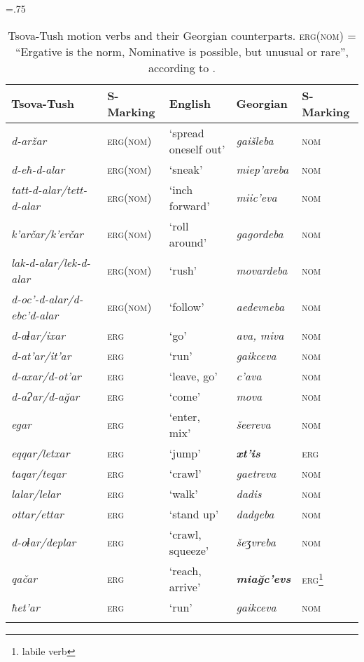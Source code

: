 \begin{table}
	\small
	\tabcolsep=.75\tabcolsep
	\begin{tabular}{lllll}
    \lsptoprule
		Tsova-Tush & {S-Marking} & {English} & {Georgian} & {S-Marking} \\
		\midrule
		\textit{d-aržar} & \textsc{erg(nom)} &  `spread oneself out'  &  \textit{gaišleba} & \textsc{nom} \\
		\textit{d-eħ-d-alar}& \textsc{erg(nom)} & `sneak' &  \textit{miep'areba} & \textsc{nom} \\
		\textit{tatt-d-alar/tett-d-alar} & \textsc{erg(nom)} & `inch forward'  & \textit{miic'eva} & \textsc{nom} \\
		\textit{k'arčar/k'erčar} & \textsc{erg(nom)} & `roll around' &  \textit{gagordeba} & \textsc{nom} \\
		\textit{lak-d-alar/lek-d-alar} & \textsc{erg(nom)} & `rush' &  \textit{movardeba} & \textsc{nom} \\
		\textit{d-oc'-d-alar/d-ebc'd-alar} & \textsc{erg(nom)} & `follow' & \textit{aedevneba} & \textsc{nom} \\
		\textit{d-aɬar/ixar} & \textsc{erg} & `go'  & \textit{ava, miva} & \textsc{nom} \\ 
		\textit{d-at'ar/it'ar} & \textsc{erg} & `run'  & \textit{gaikceva} & \textsc{nom} \\
		\textit{d-axar/d-ot'ar}& \textsc{erg} & `leave, go' &  \textit{c'ava} & \textsc{nom} \\
		\textit{d-aɁar/d-a\u{g}ar} & \textsc{erg} & `come' &  \textit{mova} & \textsc{nom} \\
		\textit{egar} & \textsc{erg} & `enter, mix'  &  \textit{šeereva} & \textsc{nom} \\
		\textit{eqqar/letxar} & \textsc{erg} & `jump' &  \textbf{\textit{xt'is}} & \textsc{erg} \\
		\textit{taqar/teqar} & \textsc{erg} & `crawl' &  \textit{gaetreva} & \textsc{nom} \\
		\textit{lalar/lelar} & \textsc{erg} & `walk' &  \textit{dadis} & \textsc{nom} \\
		\textit{ottar/ettar} & \textsc{erg} & `stand up' &  \textit{dadgeba} & \textsc{nom} \\
		\textit{d-oɬar/deplar}& \textsc{erg} & `crawl, squeeze' & \textit{šeʒvreba} & \textsc{nom} \\
		\textit{qačar}& \textsc{erg} & `reach, arrive' &  \textbf{\textit{mia\u{g}c'evs}} & \textsc{erg}\footnote{labile verb}\\
		\textit{ħet'ar} & \textsc{erg} & `run'  & \textit{gaikceva} & \textsc{nom} \\
		\lspbottomrule
	\end{tabular}
	\caption{Tsova-Tush motion verbs and their Georgian counterparts.
		\textsc{erg(nom)} = “Ergative is the norm, Nominative is possible, but unusual or rare”, according to \textcites[]{holisky87}.}
	\label{verbderiv-table-motion}
\end{table}

